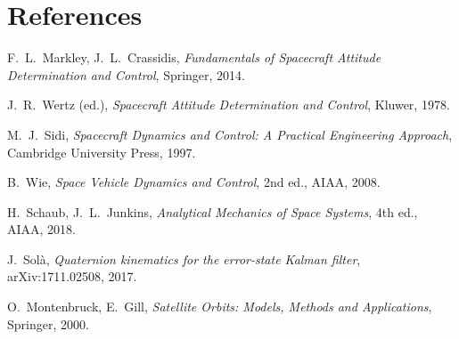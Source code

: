 \documentclass[11pt,a4paper]{article}
\begin{document}
\section*{References}
\begin{enumerate}[label={[\arabic*]}]
  \item F.~L.~Markley, J.~L.~Crassidis, \emph{Fundamentals of Spacecraft
        Attitude Determination and Control}, Springer, 2014.
  \item J.~R.~Wertz (ed.), \emph{Spacecraft Attitude Determination and
        Control}, Kluwer, 1978.
  \item M.~J.~Sidi, \emph{Spacecraft Dynamics and Control: A Practical
        Engineering Approach}, Cambridge University Press, 1997.
  \item B.~Wie, \emph{Space Vehicle Dynamics and Control}, 2nd ed., AIAA, 2008.
  \item H.~Schaub, J.~L.~Junkins, \emph{Analytical Mechanics of Space Systems},
        4th ed., AIAA, 2018.
  \item J.~Sol\`a, \emph{Quaternion kinematics for the error-state Kalman
        filter}, arXiv:1711.02508, 2017.
  \item O.~Montenbruck, E.~Gill, \emph{Satellite Orbits: Models, Methods and
        Applications}, Springer, 2000.
\end{enumerate}
\end{document}

